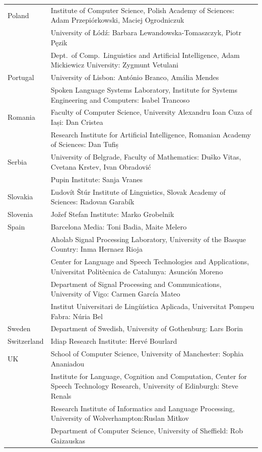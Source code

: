 \documentclass[10pt, plain]{../../metanetpaper}
\begin{document}
\begin{longtable}{@{}lp{137mm}@{}}
Poland & Institute of Computer Science, Polish Academy of Sciences: Adam Przepiórkowski, Maciej Ogrodniczuk \\ \addlinespace
& University of Łódź: Barbara Lewandowska-Tomaszczyk, Piotr Pęzik\\ \addlinespace
& Dept.~of Comp.~Linguistics and Artificial Intelligence, Adam Mickiewicz University: Zygmunt Vetulani \\ \addlinespace
Portugal & University of Lisbon: António Branco, Amália Mendes \\ \addlinespace 
& Spoken Language Systems Laboratory, Institute for Systems Engineering and Computers: Isabel Trancoso \\ \addlinespace
Romania & Faculty of Computer Science, University Alexandru Ioan Cuza of Iași: Dan Cristea \\ \addlinespace
& Research Institute for Artificial Intelligence, Romanian Academy of Sciences:  Dan Tufiș \\ \addlinespace
Serbia  & University of Belgrade, Faculty of Mathematics: Duško Vitas, Cvetana Krstev,  Ivan Obradović \\ \addlinespace
& Pupin Institute: Sanja Vranes \\ \addlinespace  
Slovakia & Ľudovít Štúr Institute of Linguistics, Slovak Academy of Sciences: Radovan Garabík \\ \addlinespace 
Slovenia & Jožef Stefan Institute: Marko Grobelnik \\ \addlinespace 
Spain & Barcelona Media: Toni Badia, Maite Melero \\ \addlinespace  
& Aholab Signal Processing Laboratory, University of the Basque Country:  Inma Hernaez Rioja \\ \addlinespace 
& Center for Language and Speech Technologies and Applications, Universitat Politècnica de Catalunya:  Asunción Moreno \\ \addlinespace 
& Department of Signal Processing and Communications, University of Vigo:  Carmen García Mateo \\ \addlinespace 
& Institut Universitari de Lingüística Aplicada, Universitat Pompeu Fabra: Núria Bel \\ \addlinespace 
Sweden & Department of Swedish, University of Gothenburg: Lars Borin \\ \addlinespace 
Switzerland & Idiap Research Institute: Hervé Bourlard \\ \addlinespace 
UK & School of Computer Science, University of Manchester: Sophia Ananiadou \\ \addlinespace  & Institute for Language, Cognition and Computation, Center for Speech Technology Research, University of Edinburgh: Steve Renals \\ \addlinespace 
& Research Institute of Informatics and Language Processing, University of Wolverhampton:\newline Ruslan Mitkov \\ \addlinespace
& Department of Computer Science, University of Sheffield: Rob Gaizauskas\\ 
\end{longtable}
\normalsize
\end{document}
